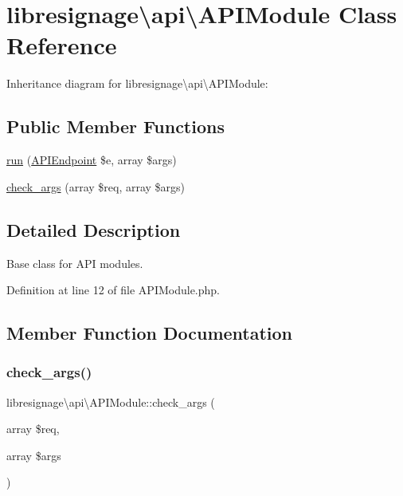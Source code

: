 \hypertarget{classlibresignage_1_1api_1_1APIModule}{}\section{libresignage\textbackslash{}api\textbackslash{}A\+P\+I\+Module Class Reference}
\label{classlibresignage_1_1api_1_1APIModule}


Inheritance diagram for libresignage\textbackslash{}api\textbackslash{}A\+P\+I\+Module\+:
\subsection*{Public Member Functions}
\begin{DoxyCompactItemize}
\item 
\hyperlink{classlibresignage_1_1api_1_1APIModule_a8a11ed26af088cde793cd46e399cf3e1}{run} (\hyperlink{classlibresignage_1_1api_1_1APIEndpoint}{A\+P\+I\+Endpoint} \$e, array \$args)
\item 
\hyperlink{classlibresignage_1_1api_1_1APIModule_acae2a80e091e8146e8c29bbc4009085d}{check\+\_\+args} (array \$req, array \$args)
\end{DoxyCompactItemize}


\subsection{Detailed Description}
Base class for A\+PI modules. 

Definition at line 12 of file A\+P\+I\+Module.\+php.



\subsection{Member Function Documentation}
\mbox{\label{classlibresignage_1_1api_1_1APIModule_acae2a80e091e8146e8c29bbc4009085d}} 
\subsubsection{\texorpdfstring{check\+\_\+args()}{check\_args()}}
{\footnotesize\ttfamily libresignage\textbackslash{}api\textbackslash{}\+A\+P\+I\+Module\+::check\+\_\+args (\begin{DoxyParamCaption}\item[{array}]{\$req,  }\item[{array}]{\$args }\end{DoxyParamCaption})\hspace{0.3cm}{\ttfamily [final]}}

